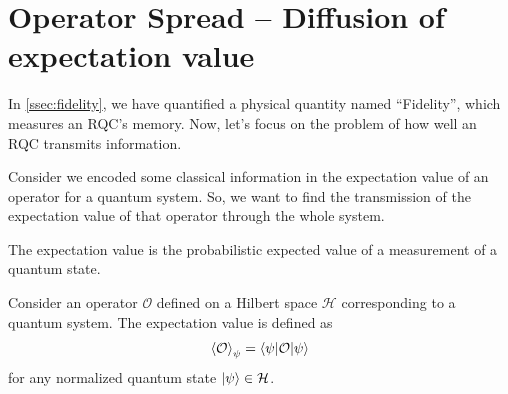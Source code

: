 \documentclass[11pt, oneside, listof=totoc]{scrbook}
\renewcommand{\H}{\mathcal{H}}
\begin{document}
\section{Operator Spread -- Diffusion of expectation value}

In \cref{ssec:fidelity}, we have quantified a physical quantity named ``Fidelity'', which measures an RQC's memory. Now, let's focus on the problem of how well an RQC transmits information.

Consider we encoded some classical information in the expectation value of an operator for a quantum system. So, we want to find the transmission of the expectation value of that operator through the whole system.
\begin{definition}
    The expectation value is the probabilistic expected value of a measurement of a quantum state.

    \noindent Consider an operator \(\mathcal{O}\) defined on a Hilbert space \(\H\) corresponding to a quantum system. The expectation value is defined as
    \begin{equation}
        \expval{\mathcal{O}}_{\psi} = \ev**{\mathcal{O}}{\psi}
    \end{equation}
    for any normalized quantum state \(\ket{\psi} \in \H\).
\end{definition}
\end{document}
